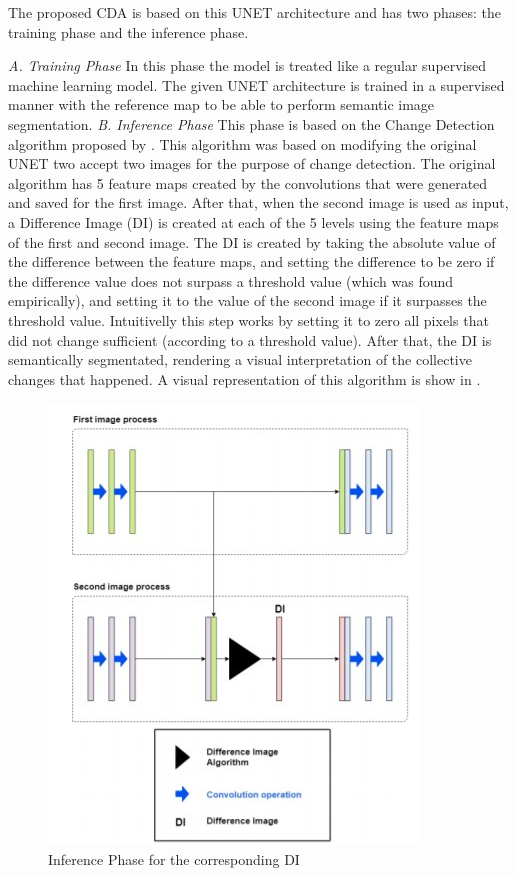 The proposed CDA is based on this UNET architecture and has two phases: the training phase and the inference phase.

\textit{A. Training Phase}
\newline
In this phase the model is treated like a regular supervised machine learning model. The given UNET architecture is trained in a supervised manner with the reference map
to be able to perform semantic image segmentation. 
\newline
\textit{B. Inference Phase}
\newline
This phase is based on the Change Detection algorithm proposed by \cite{Kevin}. This algorithm was based on modifying the original UNET two accept two images for the purpose of change detection.
The original algorithm has 5 feature maps created by the convolutions that were generated and saved for the first image. After that, when the second image is used as input, a Difference Image (DI) is
created at each of the 5 levels using the feature maps of the first and second image.
The DI is created by taking the absolute value of the difference between the feature maps, and setting the difference to be zero if the difference value does not surpass a threshold value (which was found empirically), and setting it to 
the value of the second image if it surpasses the threshold value. Intuitivelly this step works by setting it to zero all pixels that did not change sufficient (according to a threshold value). After that, the DI is semantically segmentated, rendering a visual 
interpretation of the collective changes that happened. A visual representation of this algorithm is show in .

\begin{figure}[ht]
    \centering
    \includegraphics{Chapter7/kevin_algorithm.jpg}
    \caption{Inference Phase for the corresponding DI}
    \label{fig:kevin_algorithm}
\end{figure}

